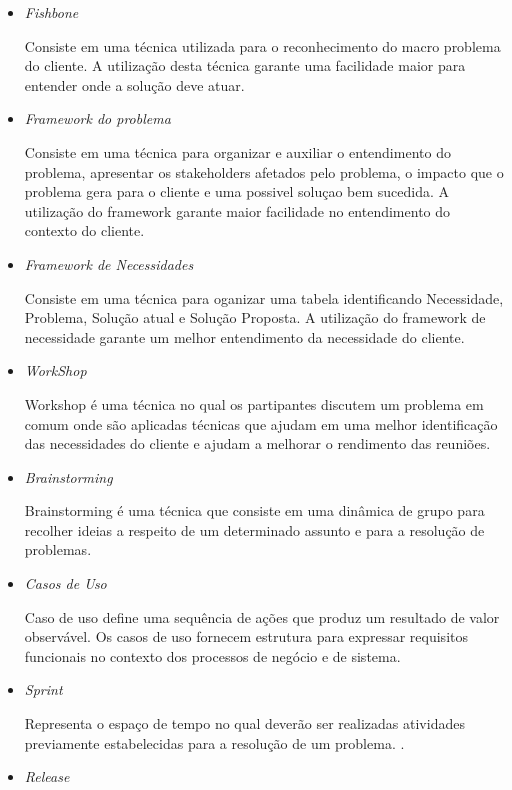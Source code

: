 \begin{itemize}
	\item \textit{Fishbone}

		Consiste em uma técnica utilizada para o reconhecimento do macro problema do cliente. A utilização desta técnica garante uma facilidade maior para entender onde a solução deve atuar.

	\item \textit{Framework do problema}

		Consiste em uma técnica para organizar e auxiliar o entendimento do problema, apresentar os stakeholders afetados pelo problema, o impacto que o problema gera para o cliente e uma possivel soluçao bem sucedida. A utilização do framework garante maior facilidade no entendimento do contexto do cliente.

	\item \textit{Framework de Necessidades}

		Consiste em uma técnica para oganizar uma tabela identificando Necessidade, Problema, Solução atual e Solução Proposta. A utilização do framework de necessidade garante um melhor entendimento da necessidade do cliente.
 
	\item \textit{WorkShop}

		 Workshop é uma técnica no qual os partipantes discutem um problema em comum onde são aplicadas técnicas que ajudam em uma melhor identificação das necessidades do cliente e ajudam a melhorar o rendimento das reuniões.

	\item \textit{Brainstorming}

		 Brainstorming é uma técnica que consiste em uma dinâmica de grupo para recolher ideias a respeito de um determinado assunto e para a resolução de problemas.

	\item \textit{Casos de Uso}

		 Caso de uso define uma sequência de ações que produz um resultado de valor observável. Os casos de uso fornecem estrutura para expressar requisitos funcionais no contexto dos processos de negócio e de sistema.

	\item \textit{Sprint}

		Representa o espaço de tempo no qual deverão ser realizadas atividades previamente estabelecidas para a resolução de um problema. \cite{beck2000extreme}.

	\item \textit{Release}


\end{itemize}
